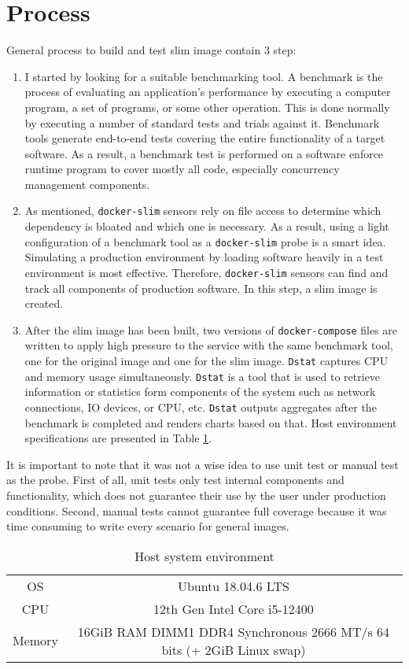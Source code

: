 \documentclass[10pt]{article}
\begin{document}
\section{Process}
General process to build and test slim image contain 3 step:
\begin{enumerate}
    \item I started by looking for a suitable benchmarking tool. A benchmark is the process of evaluating an application's performance by executing a computer program, a set of programs, or some other operation. This is done normally by executing a number of standard tests and trials against it. Benchmark tools generate end-to-end tests covering the entire functionality of a target software. As a result, a benchmark test is performed on a software enforce runtime program to cover mostly all code, especially concurrency management components.
    \item As mentioned, {\tt docker-slim} sensors rely on file access to determine which dependency is bloated and which one is necessary. As a result, using a light configuration of a benchmark tool as a {\tt docker-slim} probe is a smart idea. Simulating a production environment by loading software heavily in a test environment is most effective. Therefore, {\tt docker-slim} sensors can find and track all components of production software. In this step, a slim image is created.
    \item After the slim image has been built, two versions of {\tt docker-compose} files are written to apply high pressure to the service with the same benchmark tool, one for the original image and one for the slim image. {\tt Dstat} captures CPU and memory usage simultaneously. {\tt Dstat} is a tool that is used to retrieve information or statistics form components of the system such as network connections, IO devices, or CPU, etc. {\tt Dstat} outputs aggregates after the benchmark is completed and renders charts based on that. Host environment specifications are presented in Table \ref{host-env}.
\end{enumerate}

It is important to note that it was not a wise idea to use unit test or manual test as the probe. First of all, unit tests only test internal components and functionality, which does not guarantee their use by the user under production conditions. Second, manual tests cannot guarantee full coverage because it was time consuming to write every scenario for general images.

\begin{table}[b]
    \caption{Host system environment}
    \label{host-env}
    \begin{center}
        \begin{tabular}{ |c c| } 
        \hline
        OS & Ubuntu 18.04.6 LTS \\
        CPU & 12th Gen Intel Core i5-12400 \\
        Memory & 16GiB RAM DIMM1 DDR4 Synchronous 2666 MT/s 64 bits (+ 2GiB Linux swap) \\
        \hline
        \end{tabular}
    \end{center}
\end{table}
\end{document}
